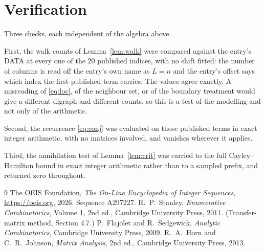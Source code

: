 \documentclass[11pt,a4paper]{article}
\theoremstyle{plain}
\theoremstyle{definition}
\begin{document}
\section{Verification}

Three checks, each independent of the algebra above.

First, the walk counts of Lemma~\ref{lem:walk} were compared against the entry's DATA at
every one of the $20$ published indices, with no shift fitted: the number of columns is
read off the entry's own name as $L=n$ and the entry's offset says which index the first
published term carries. The values agree exactly. A misreading of \eqref{eq:loc}, of the
neighbour set, or of the boundary treatment would give a different digraph and different
counts, so this is a test of the modelling and not only of the arithmetic.

Second, the recurrence \eqref{eq:conj} was evaluated on those published terms in exact
integer arithmetic, with no matrices involved, and vanishes wherever it applies.

Third, the annihilation test of Lemma~\ref{lem:crit} was carried to the full
Cayley--Hamilton bound in exact integer arithmetic rather than to a sampled prefix, and
returned zero throughout.

\begin{thebibliography}{9}
 The OEIS Foundation, \emph{The On-Line Encyclopedia of Integer
Sequences}, \url{https://oeis.org}, 2026. Sequence A297227.
 R.~P.~Stanley, \emph{Enumerative Combinatorics}, Volume 1, 2nd ed.,
Cambridge University Press, 2011. (Transfer-matrix method, Section 4.7.)
 P.~Flajolet and R.~Sedgewick, \emph{Analytic Combinatorics}, Cambridge
University Press, 2009.
 R.~A.~Horn and C.~R.~Johnson, \emph{Matrix Analysis}, 2nd ed., Cambridge
University Press, 2013.
\end{thebibliography}
\end{document}
